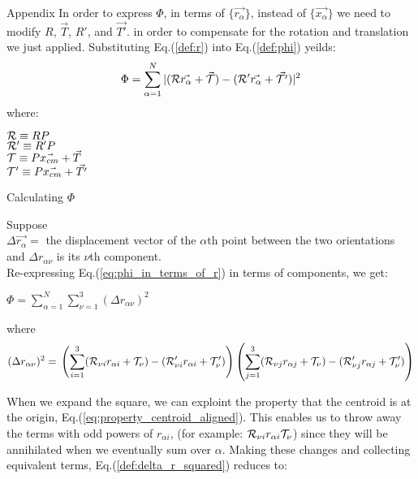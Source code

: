 \begin{appendix}{Appendix}
    In order to express $\Phi$,
in terms of $\{ \vec{r_\alpha} \}$, instead of $\{ \vec{x_\alpha} \}$
we need to modify $R$, $\vec{T}$, $R'$, and $\vec{T'}$.
in order to compensate for the rotation and translation we just applied.
Substituting Eq.(\ref{def:r}) into Eq.(\ref{def:phi}) yeilds:
\begin{equation}
\Phi =
\sum_{\alpha=1}^N
|
({\cal R} \vec{r_\alpha} + \vec{\cal T}) -
({\cal R'} \vec{r_\alpha} + \vec{\cal T'})
|^2 \label{eq:phi_in_terms_of_r}
\end{equation}
where:
\begin{center}
${\cal R} \equiv R P$\\
${\cal R'} \equiv R' P$\\
${\cal T}  \equiv P \vec{x_{cm}} + \vec{T}$\\
${\cal T'} \equiv P \vec{x_{cm}} + \vec{T'}$
\end{center}

\begin{center}
Calculating $\Phi$
\end{center}
Suppose\\
$\Delta \vec{r_\alpha} =$ the displacement vector of the
$\alpha$th point between the two orientations\\
and $\Delta r_{\alpha \nu}$ is its $\nu$th component.\\
Re-expressing Eq.(\ref{eq:phi_in_terms_of_r}) in terms of components, we get:
\begin{center}
$\Phi=\sum_{\alpha=1}^N \sum_{\nu=1}^3 (\Delta r_{\alpha \nu})^2$
\end{center}
where
\begin{equation}
(\Delta r_{\alpha \nu})^2 = \\
\left(
 \sum_{i=1}^3
    ({\cal R}_{\nu i} r_{\alpha i} + {\cal T}_\nu)
  - ({\cal R}'_{\nu i} r_{\alpha i} + {\cal T}'_\nu)
\right)
\left(
 \sum_{j=1}^3
    ({\cal R}_{\nu j} r_{\alpha j} + {\cal T}_\nu)
  - ({\cal R}'_{\nu j} r_{\alpha j} + {\cal T}'_\nu)
\right)  \label{def:delta_r_squared}
\end{equation}

When we expand the square, we can exploint the property that the
centroid is at the origin, Eq.(\ref{eq:property_centroid_aligned}).
This enables us to throw away the terms with odd powers of $r_{\alpha i}$,
(for example: \mbox{${\cal R}_{\nu i} r_{\alpha i} {\cal T}_\nu$})
since they will be annihilated when we eventually sum over $\alpha$.
Making these changes and collecting equivalent terms,
Eq.(\ref{def:delta_r_squared}) reduces to:


\end{appendix}
